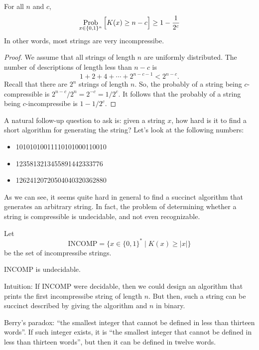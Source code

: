 \begin{theorem}
    For all $n$ and $c$,
    $$
    \operatorname*{\mathrm{Prob}}_{x \in \{0,1\}^n} \Big[ K(x) \geq n-c \Big] \geq 1 - \frac{1}{2^c}
    $$
    In other words, most strings are very incompressibe.
\end{theorem}

\begin{proof}
    We assume that all strings of length $n$ are uniformly distributed. The number of descriptions of length less than $n-c$ is
    $$
    1 + 2 + 4 + \cdots + 2^{n-c-1} < 2^{n-c}.
    $$
    Recall that there are $2^n$ strings of length $n$. So, the probably of a string being $c$-compressible is $2^{n-c}/2^n = 2^{-c} = 1/2^c$. It follows that the probably of a string being $c$-incompressibe is $1 - 1/2^c$.
\end{proof}

A natural follow-up question to ask is: given a string $x$, how hard is it to find a short algorithm for generating the string? Let's look at the following numbers:
\begin{itemize}
    \item 10101010011110101000110010
    \item 1235813213455891442333776
    \item 12624120720504040320362880
\end{itemize}
As we can see, it seems quite hard in general to find a succinct algorithm that generates an arbitrary string. In fact, the problem of determining whether a string is compressible is undecidable, and not even recognizable.

\begin{definition}
    Let
    $$
    \mathrm{INCOMP} = \{ x \in \{0,1\}^* \mid K(x) \geq |x| \}
    $$
    be the set of incompressibe strings.
\end{definition}

\begin{theorem}
    INCOMP is undecidable.
\end{theorem}

Intuition: If INCOMP were decidable, then we could design an algorithm that prints the first incompressibe string of length $n$. But then, such a string can be succinct described by giving the algorithm and $n$ in binary.

\begin{remark}
    Berry's paradox: ``the smallest integer that cannot be defined in less than thirteen words''. If such integer exists, it is ``the smallest integer that cannot be defined in less than thirteen words'', but then it can be defined in twelve words.
\end{remark}

